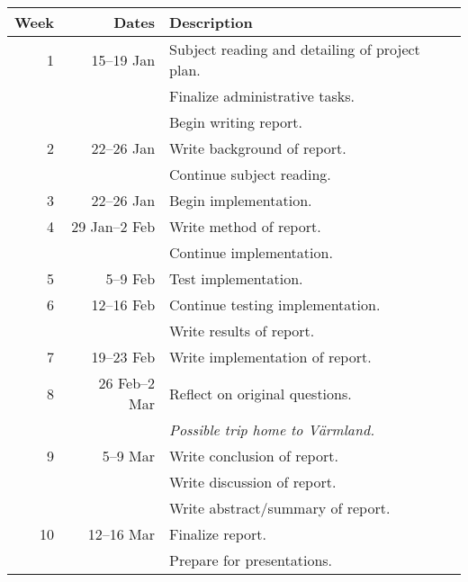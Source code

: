 \documentclass[a4paper, parskip]{scrartcl}
\begin{document}
\begin{center}
  \begin{tabular}{rrl}
    \toprule
    \midrule
    \textbf{Week} & \textbf{Dates} & \textbf{Description} \\
    \midrule
    1 & 15--19 Jan & Subject reading and detailing of project plan. \\
    & & Finalize administrative tasks. \\
    & & Begin writing report. \\
    \midrule
    2 & 22--26 Jan & Write background of report. \\
    & & Continue subject reading. \\
    \midrule
    3 & 22--26 Jan & Begin implementation. \\
    \midrule
    4 & 29 Jan--2 Feb & Write method of report. \\
    & & Continue implementation. \\
    \midrule
    5 & 5--9 Feb & Test implementation. \\
    \midrule
    6 & 12--16 Feb & Continue testing implementation. \\
    & & Write results of report. \\
    \midrule
    7 & 19--23 Feb & Write implementation of report. \\
    \midrule
    8 & 26 Feb--2 Mar & Reflect on original questions. \\
    & & \emph{Possible trip home to Värmland.} \\
    \midrule
    9 & 5--9 Mar & Write conclusion of report. \\
    & & Write discussion of report. \\
    & & Write abstract/summary of report. \\
    \midrule
    10 & 12--16 Mar & Finalize report. \\
    & & Prepare for presentations. \\
    \midrule
    \bottomrule
  \end{tabular}
\end{center}
\end{document}
